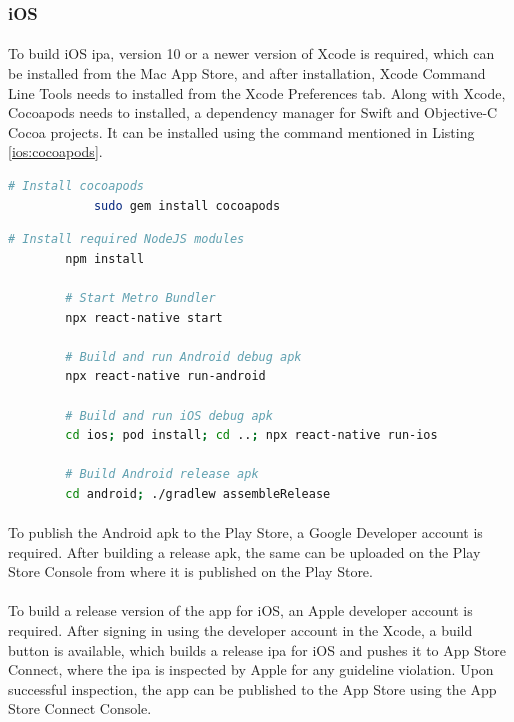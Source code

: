 \documentclass[12pt]{article}
\begin{document}
        \subsubsection{iOS}
            \paragraph{}
            To build iOS \acrshort{ipa}, version 10 or a newer version of Xcode is required, which can be installed from the Mac App Store, and after installation, Xcode Command Line Tools needs to installed from the Xcode Preferences tab. Along with Xcode, Cocoapods needs to installed, a dependency manager for Swift and Objective-C Cocoa projects. It can be installed using the command mentioned in Listing \ref{ios:cocoapods}.
        
            \begin{lstlisting}[language=bash, caption=Cocoapods installation, label=ios:cocoapods]
            # Install cocoapods
            sudo gem install cocoapods    
            \end{lstlisting}
        
        \begin{lstlisting}[language=bash, caption=Smartphone Application]
        # Install required NodeJS modules
        npm install
    
        # Start Metro Bundler
        npx react-native start
    
        # Build and run Android debug apk
        npx react-native run-android
        
        # Build and run iOS debug apk
        cd ios; pod install; cd ..; npx react-native run-ios
        
        # Build Android release apk
        cd android; ./gradlew assembleRelease
        \end{lstlisting}
        
        \paragraph{}
        To publish the Android \acrshort{apk} to the Play Store, a Google Developer account is required. After building a release \acrshort{apk}, the same can be uploaded on the Play Store Console from where it is published on the Play Store.
        \paragraph{}
        To build a release version of the app for iOS, an Apple developer account is required. After signing in using the developer account in the Xcode, a build button is available, which builds a release \acrshort{ipa} for iOS and pushes it to App Store Connect, where the \acrshort{ipa} is inspected by Apple for any guideline violation. Upon successful inspection, the app can be published to the App Store using the App Store Connect Console.
    
\end{document}
